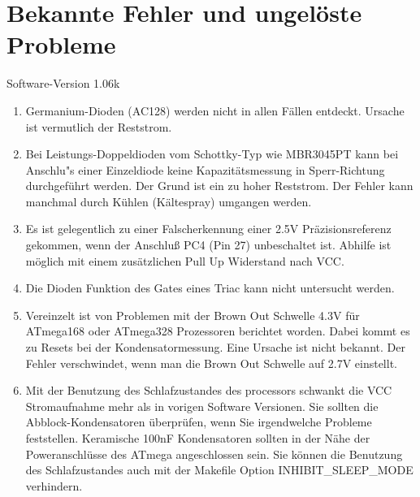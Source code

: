 
\chapter{Bekannte Fehler und ungelöste Probleme}
{\center Software-Version 1.06k}

\begin{enumerate}

\item Germanium-Dioden (AC128) werden nicht in allen Fällen entdeckt. Ursache ist vermutlich der Reststrom.

\item Bei Leistungs-Doppeldioden vom Schottky-Typ wie MBR3045PT kann bei Anschlu"s einer Einzeldiode keine Kapazitätsmessung in Sperr-Richtung 
durchgeführt werden. Der Grund ist ein zu hoher Reststrom. Der Fehler kann manchmal durch Kühlen (Kältespray) umgangen werden.

\item Es ist gelegentlich zu einer Falscherkennung einer 2.5V Präzisionsreferenz gekommen, wenn der Anschluß PC4 (Pin 27) unbeschaltet ist.
Abhilfe ist möglich mit einem zusätzlichen Pull Up Widerstand nach VCC.

\item Die Dioden Funktion des Gates eines Triac kann nicht untersucht werden.

\item Vereinzelt ist von Problemen mit der Brown Out Schwelle 4.3V für ATmega168 oder ATmega328 Prozessoren berichtet worden.
Dabei kommt es zu Resets bei der Kondensatormessung.  Eine Ursache ist nicht bekannt.
Der Fehler verschwindet, wenn man die Brown Out Schwelle auf 2.7V einstellt.

\item Mit der Benutzung des Schlafzustandes des processors schwankt die VCC Stromaufnahme mehr als
in vorigen Software Versionen. Sie sollten die Abblock-Kondensatoren überprüfen, wenn Sie irgendwelche
Probleme feststellen. Keramische 100nF Kondensatoren sollten in der Nähe der Poweranschlüsse des ATmega
angeschlossen sein. Sie können die Benutzung des Schlafzustandes auch mit der Makefile Option
INHIBIT\_SLEEP\_MODE verhindern.

\end{enumerate}
